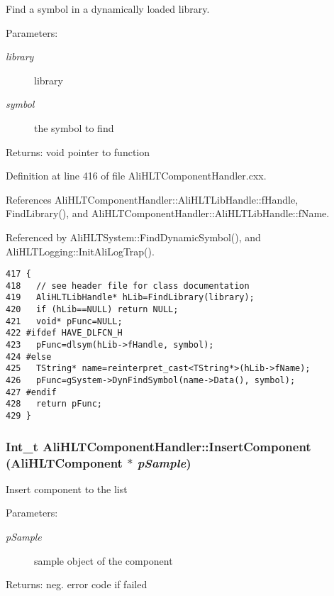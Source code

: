 Find a symbol in a dynamically loaded library. \begin{Desc}
\item[Parameters:]
\begin{description}
\item[{\em library}]library \item[{\em symbol}]the symbol to find \end{description}
\end{Desc}
\begin{Desc}
\item[Returns:]void pointer to function \end{Desc}


Definition at line 416 of file Ali\-HLTComponent\-Handler.cxx.

References Ali\-HLTComponent\-Handler::Ali\-HLTLib\-Handle::f\-Handle, Find\-Library(), and Ali\-HLTComponent\-Handler::Ali\-HLTLib\-Handle::f\-Name.

Referenced by Ali\-HLTSystem::Find\-Dynamic\-Symbol(), and Ali\-HLTLogging::Init\-Ali\-Log\-Trap().

\footnotesize\begin{verbatim}417 {
418   // see header file for class documentation
419   AliHLTLibHandle* hLib=FindLibrary(library);
420   if (hLib==NULL) return NULL;
421   void* pFunc=NULL;
422 #ifdef HAVE_DLFCN_H
423   pFunc=dlsym(hLib->fHandle, symbol);
424 #else
425   TString* name=reinterpret_cast<TString*>(hLib->fName);
426   pFunc=gSystem->DynFindSymbol(name->Data(), symbol);
427 #endif
428   return pFunc;
429 }
\end{verbatim}\normalsize 


\subsubsection{\setlength{\rightskip}{0pt plus 5cm}Int\_\-t Ali\-HLTComponent\-Handler::Insert\-Component ({\bf Ali\-HLTComponent} $\ast$ {\em p\-Sample})\hspace{0.3cm}{\tt  [private]}}\label{classAliHLTComponentHandler_d2}


Insert component to the list \begin{Desc}
\item[Parameters:]
\begin{description}
\item[{\em p\-Sample}]sample object of the component \end{description}
\end{Desc}
\begin{Desc}
\item[Returns:]neg. error code if failed \end{Desc}


